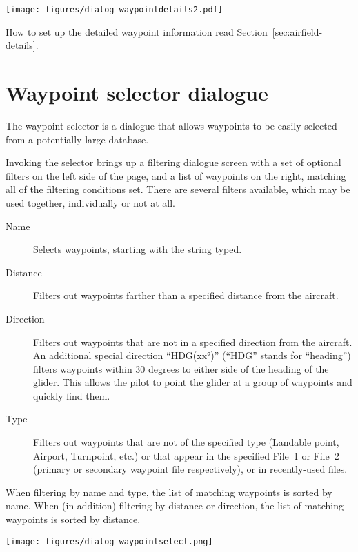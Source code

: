 \begin{center}
\texttt{[image: figures/dialog-waypointdetails2.pdf]}
\end{center}
How to set up the detailed waypoint information read Section~\ref{sec:airfield-details}.

\section{Waypoint selector dialogue}\label{sec:waypoint-selector-dialog}

The waypoint selector is a dialogue that allows waypoints to be easily selected
from a potentially large database. 

Invoking the selector brings up a filtering dialogue screen with a set of 
optional filters on the left side of the page, and a list of waypoints on the
right, matching all of the filtering conditions set.
There are several filters available, which may be used together,
individually or not at all.
\begin{description}
\item[Name] Selects waypoints, starting with the string typed.
\item[Distance] Filters out waypoints farther than a specified distance from the 
  aircraft.
\item[Direction] Filters out waypoints that are not in a specified direction 
  from the aircraft. 
  An additional special direction ``HDG(xx°)'' (``HDG'' stands for ``heading'') filters waypoints within 30
  degrees to either side of the heading of the glider.  This allows the pilot 
  to point the glider at a group of waypoints and quickly find them.
\item[Type] Filters out waypoints that are not of the specified type
(Landable point, Airport, Turnpoint, etc.) or that appear in the specified File~1 or
File~2 (primary or secondary waypoint file respectively), or in recently-used files.
\end{description}
When filtering by name and type, the list of matching waypoints is
sorted by name. When (in addition) filtering by distance or direction,
 the list of matching waypoints is sorted by distance.

\begin{center}
\texttt{[image: figures/dialog-waypointselect.png]}
\end{center}

